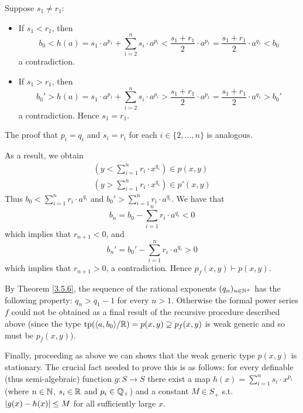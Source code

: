 \documentclass[11pt]{article}
\begin{document}
\begin{itemize}
Suppose \(s_1\neq r_1\):
\begin{itemize}
\item If \(s_1<r_1\), then
\begin{equation*}
b_0<h(a)=s_1\cdot a^{p_1}+\sum_{i=2}^ns_i\cdot a^{p_i}<\frac{s_1+r_1}{2}\cdot a^{p_1}=\frac{s_1+r_1}{2}\cdot a^{q_1}<b_0
\end{equation*}
a contradiction.
\item If \(s_1>r_1\), then
\begin{equation*}
b_0'>h(a)=s_1\cdot a^{p_1}+\sum_{i=2}^ns_i\cdot a^{p_i}>\frac{s_1+r_1}{2}\cdot a^{p_1}=\frac{s_1+r_1}{2}\cdot a^{q_1}>b_0'
\end{equation*}
a contradiction. Hence \(s_1=r_1\).
\end{itemize}
The proof that \(p_i=q_i\) and \(s_i=r_i\) for each \(i\in\{2,\dots,n\}\) is analogous.

As a result, we obtain
\begin{gather*}
(y<\sum_{i=1}^nr_i\cdot x^{q_i})\in p(x,y)\\
(y>\sum_{i=1}^nr_i\cdot x^{q_i})\in p'(x,y)
\end{gather*}
Thus \(b_0<\sum_{i=1}^nr_i\cdot a^{q_i}\) and \(b_0'>\sum_{i=1}^nr_i\cdot a^{q_i}\). We have that
\begin{equation*}
b_n=b_0-\sum_{i=1}^nr_i\cdot a^{q_i}<0
\end{equation*}
which implies that \(r_{n+1}<0\), and
\begin{equation*}
b_n'=b_0'-\sum_{i=1}^nr_i\cdot a^{q_i}>0
\end{equation*}
which implies that \(r_{n+1}>0\), a contradiction. Hence \(p_f(x,y)\vdash p(x,y)\).

By Theorem \ref{3.5.6}, the sequence of the rational exponents \((q_n)_{n\in\mathbb{N}^+}\) has the
following property: \(q_n>q_1-1\) for every \(n>1\). Otherwise the formal power series \(f\)
could not be obtained as a final result of the recursive procedure described above (since the
type \(\operatorname{tp}(\langle a,b_0\rangle/\mathbb{R})=p(x,y)\supseteq p_f(x,y)\) is weak generic and so must be \(p_f(x,y)\)).

Finally, proceeding as above we can shows that the weak generic type \(p(x,y)\) is stationary.
The crucial fact needed to prove this is as follows: for every definable (thus semi-algebraic)
function \(g:S\to S\) there exist a map \(h(x)=\sum_{i=1}^ns_i\cdot x^{p_i}\) (where \(n\in\mathbb{N}\), \(s_i\in\mathbb{R}\) and
\(p_i\in\mathbb{Q}_+\)) and a constant \(M\in S_+\) s.t. \(\abs{g(x)-h(x)}\le M\) for all sufficiently
large \(x\).
\end{itemize}
\end{document}
